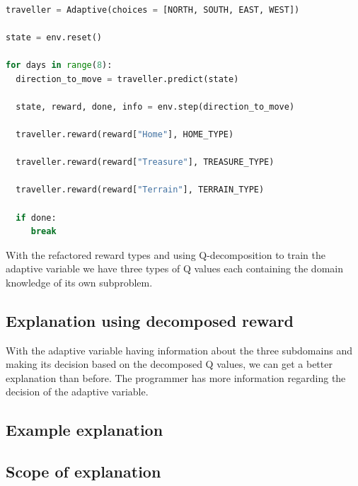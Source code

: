 \documentclass[conference]{IEEEtran}
\begin{document}
\begin{lstlisting}[language = Python,
                   label = {lst:abp_reward_decomposition},
                   caption = {Adaptive Program using reward decomposition for traveller problem},
                   captionpos = b]

traveller = Adaptive(choices = [NORTH, SOUTH, EAST, WEST])

state = env.reset()

for days in range(8):
  direction_to_move = traveller.predict(state)

  state, reward, done, info = env.step(direction_to_move)

  traveller.reward(reward["Home"], HOME_TYPE)

  traveller.reward(reward["Treasure"], TREASURE_TYPE)

  traveller.reward(reward["Terrain"], TERRAIN_TYPE)

  if done:
     break

\end{lstlisting}

With the refactored reward types and using Q-decomposition \cite{russell2003q} to train the
adaptive variable we have three types of Q values each containing the domain knowledge of
its own subproblem.

\subsection{Explanation using decomposed reward}
With the adaptive variable having information about the three subdomains and making its decision
based on the decomposed Q values, we can get a better explanation than before. The programmer
has more information regarding the decision of the adaptive variable.



\subsection{Example explanation}

\subsection{Scope of explanation}
\end{document}
